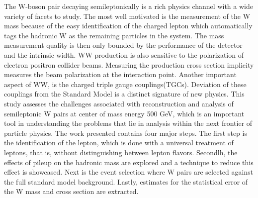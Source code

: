 The W-boson pair decaying semileptonically is a rich physics channel with a wide variety of facets to study. The most well motivated is the measurement of the W mass because of the easy identification of the charged lepton which automatically tags the hadronic W as the remaining particles in the system. The mass measurement quality is then only bounded by the performance of the detector and the intrinsic width. WW production is also sensitive to the polarization of electron positron collider beams.  Measuring the production cross section implicity measures the beam polarization at the interaction point. Another important aspect of WW, is the charged triple gauge couplings(TGCs). Deviation of these couplings from the Standard Model is a distinct signature of new physics. This study assesses the challenges associated with reconstruction and analysis of semileptonic W pairs at center of mass energy 500 GeV, which is an important tool in understanding the problems that lie in analysis within the next frontier of particle physics. The work presented contains four major steps. The first step is the identification of the lepton, which is done with a universal treatment of leptons, that is, without distinguishing between lepton flavors.  Secondlh, the effects of pileup on the hadronic mass are explored and a technique to reduce this effect is showcased. Next is the event selection where W pairs are selected against the full standard model background. Lastly, estimates for the statistical error of the W mass and cross section are extracted.